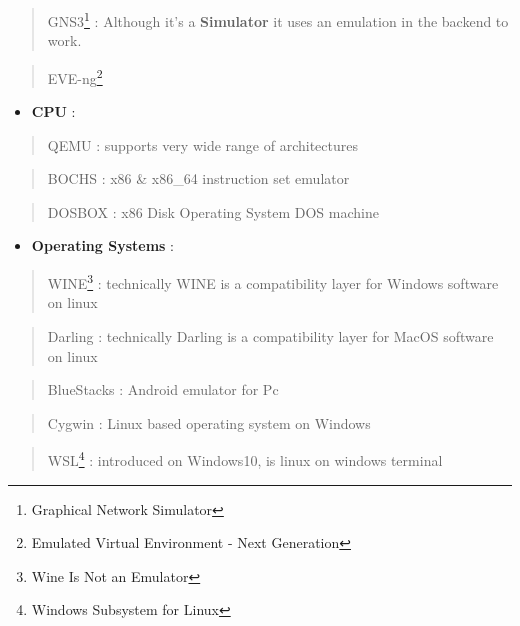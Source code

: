 \documentclass[
  14pt,
  english,
  a4paper,
]{scrreprt}
\providecommand{\tightlist}{%
  \setlength{\itemsep}{0pt}\setlength{\parskip}{0pt}}
\begin{document}
\begin{quote}
GNS3\footnote{Graphical Network Simulator} : Although it's a
\textbf{Simulator} it uses an emulation in the backend to work.
\end{quote}

\begin{quote}
EVE-ng\footnote{Emulated Virtual Environment - Next Generation}
\end{quote}

\begin{itemize}
\tightlist
\item
  \textbf{CPU} :
\end{itemize}

\begin{quote}
QEMU : supports very wide range of architectures
\end{quote}

\begin{quote}
BOCHS : x86 \& x86\_64 instruction set emulator
\end{quote}

\begin{quote}
DOSBOX : x86 Disk Operating System DOS machine
\end{quote}

\begin{itemize}
\tightlist
\item
  \textbf{Operating Systems} :
\end{itemize}

\begin{quote}
WINE\footnote{Wine Is Not an Emulator} : technically WINE is a
compatibility layer for Windows software on linux
\end{quote}

\begin{quote}
Darling : technically Darling is a compatibility layer for MacOS
software on linux
\end{quote}

\begin{quote}
BlueStacks : Android emulator for Pc
\end{quote}

\begin{quote}
Cygwin : Linux based operating system on Windows
\end{quote}

\begin{quote}
WSL\footnote{Windows Subsystem for Linux} : introduced on Windows10, is
linux on windows terminal
\end{quote}
\end{document}
